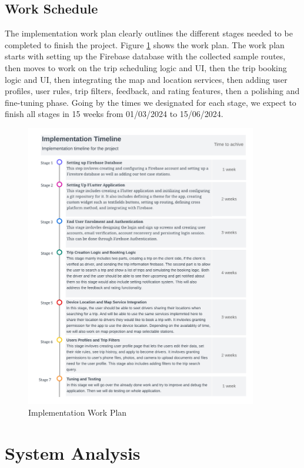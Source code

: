 \documentclass[a4paper, 12pt]{report} %
\begin{document}
        \subsection{Work Schedule}
            The implementation work plan clearly outlines the different stages needed to be completed to finish the project. Figure \ref{fig:work_plan} shows the work plan. The work plan starts with setting up the Firebase database with the collected sample routes, then moves to work on the trip scheduling logic and UI, then the trip booking logic and UI, then integrating the map and location services, then adding user profiles, user rules, trip filters, feedback, and rating features, then a polishing and fine-tuning phase. Going by the times we designated for each stage, we expect to finish all stages in 15 weeks from 01/03/2024 to 15/06/2024. 
            \begin{figure}[H]
                \centering
                \includegraphics[width=0.9\textwidth]{Images/implemntation_timeline.png}
                \caption{Implementation Work Plan}
                \label{fig:work_plan}
            \end{figure}
        
    \pagebreak
    \section{System Analysis}  
\end{document}
